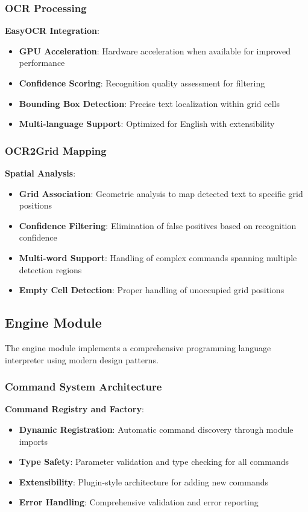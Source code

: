 \subsubsection{OCR Processing}
\textbf{EasyOCR Integration}:
\begin{itemize}
    \item \textbf{GPU Acceleration}: Hardware acceleration when available for improved performance
    \item \textbf{Confidence Scoring}: Recognition quality assessment for filtering
    \item \textbf{Bounding Box Detection}: Precise text localization within grid cells
    \item \textbf{Multi-language Support}: Optimized for English with extensibility
\end{itemize}

\subsubsection{OCR2Grid Mapping}
\textbf{Spatial Analysis}:
\begin{itemize}
    \item \textbf{Grid Association}: Geometric analysis to map detected text to specific grid positions
    \item \textbf{Confidence Filtering}: Elimination of false positives based on recognition confidence
    \item \textbf{Multi-word Support}: Handling of complex commands spanning multiple detection regions
    \item \textbf{Empty Cell Detection}: Proper handling of unoccupied grid positions
\end{itemize}

\subsection{Engine Module}

The engine module implements a comprehensive programming language interpreter using modern design patterns.

\subsubsection{Command System Architecture}
\textbf{Command Registry and Factory}:
\begin{itemize}
    \item \textbf{Dynamic Registration}: Automatic command discovery through module imports
    \item \textbf{Type Safety}: Parameter validation and type checking for all commands
    \item \textbf{Extensibility}: Plugin-style architecture for adding new commands
    \item \textbf{Error Handling}: Comprehensive validation and error reporting
\end{itemize}

